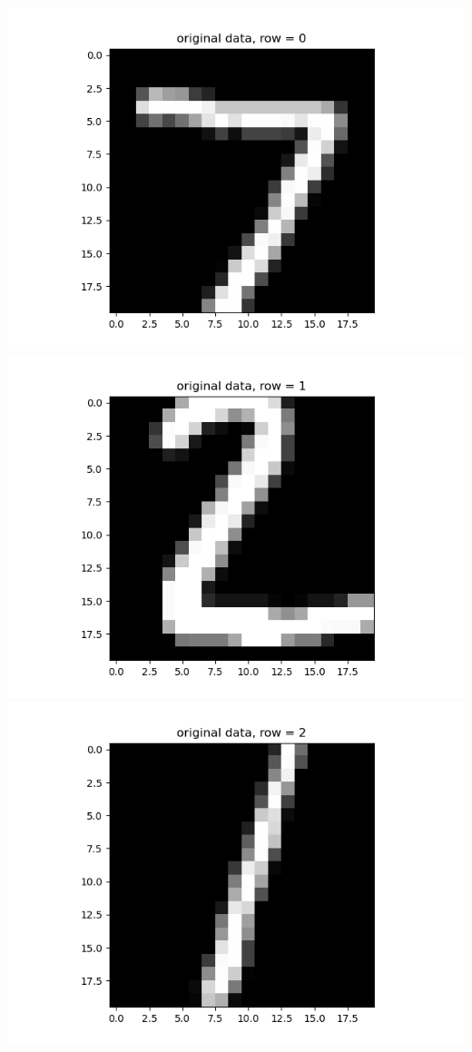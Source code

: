 \documentclass{article}
\begin{document}
\begin{enumerate}
\begin{enumerate}
		\begin{center}
			\includegraphics[scale=.4]{hw3 orig, row = 0}
			\includegraphics[scale=.4]{hw3 orig, row = 1}
			\includegraphics[scale=.4]{hw3 orig, row = 2}

\end{center}
\end{enumerate}
\end{enumerate}
\end{document}
